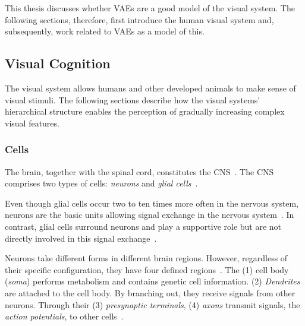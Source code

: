 This thesis discusses whether \acp{VAE} are a good model of the visual system.
The following sections, therefore, first introduce the human visual system and, subsequently, work related to \acp{VAE} as a model of this.

\subsection{Visual Cognition}\label{subsec:human-brain-structure}

The visual system allows humans and other developed animals to make sense of visual stimuli.
The following sections describe how the visual systems' hierarchical structure enables the perception of gradually increasing complex visual features.

\subsubsection{Cells}

The brain, together with the spinal cord, constitutes the \ac{CNS}~\citep[p. 340]{mack2013principles}.
The \ac{CNS} comprises two types of cells: \textit{neurons} and \textit{glial cells}~\citep[p. 71]{mack2013principles}.

Even though glial cells occur two to ten times more often in the nervous system, neurons are the basic units allowing signal exchange in the nervous system~\citep[p. 24]{mack2013principles}.
In contrast, glial cells surround neurons and play a supportive role but are not directly involved in this signal exchange~\citep[p. 26]{mack2013principles}.

Neurons take different forms in different brain regions.
However, regardless of their specific configuration, they have four defined regions~\citep[p. 22]{mack2013principles}.
The (1) cell body (\textit{soma}) performs metabolism and contains genetic cell information.
(2) \textit{Dendrites} are attached to the cell body.
By branching out, they receive signals from other neurons.
Through their (3) \textit{presynaptic terminals}, (4) \textit{axons} transmit signals, the \textit{action potentials}, to other cells~\citep[pp. 22, 23]{mack2013principles}.


